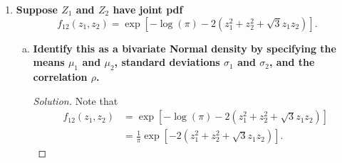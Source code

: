 \documentclass[11pt]{article}
\newenvironment{solution}
  {\renewcommand\qedsymbol{$\blacksquare$}\begin{proof}[Solution]}
  {\end{proof}}
\begin{document}
\begin{enumerate}
\begin{enumerate}[a)]
\begin{solution}
      which intuitively is the pdf for a $\mathrm{Gamma}(2, \lambda)$ random variable. 
      \end{solution}

      \item \textbf{Show that taking partial derivatives of $F_{xy}$ with respect to $x$ and $y$ yields the joint pdf:}
      \[
        \frac{\partial^2}{\partial x \partial y}F_{xy}(x, y) = \lambda^2 e^{-\lambda y}I(0< x < y). 
      \]

      \begin{solution}
      Finally, we can derive the joint pdf. Note that
      \begin{align*}
        f_{xy}(x, y) = \frac{\partial^2}{\partial x \partial y}F_{xy}(x, y) &= \frac{\partial}{\partial x}\left( \frac{\partial}{\partial y} F_{xy}(x, y)\right) \\
        &= \frac{\partial}{\partial x}\left( \frac{\partial}{\partial y} F_{xy}(x, y)\right) \\
        &= \frac{\partial}{\partial x}\left( \frac{\partial}{\partial y}  \left( I(0 < x < y) \left(1 - e^{-\lambda x} - \lambda xe^{-\lambda y}\right) \right)\right) \\
        &= \frac{\partial}{\partial x}\left( I(0 < x < y) \lambda^2 xe^{-\lambda y} \right) \\
        &= \boxed{\lambda^2 e^{-\lambda y}I(0 < x < y)}
      \end{align*}

      as desired.
      \end{solution}
    \end{enumerate}

    \newpage

    \item \textbf{Suppose $Z_1$ and $Z_2$ have joint pdf}
    \[
      f_{12}(z_1, z_2) = \exp \left[ -\log (\pi ) - 2(z_1^2 + z_2^2 + \sqrt{3}z_1 z_2) \right].
    \]
    \begin{enumerate}[a)]
      \item \textbf{Identify this as a bivariate Normal density by specifying the means $\mu_1$ and $\mu_2$, standard deviations $\sigma_1$ and $\sigma_2$, and the correlation $ \rho $.}
      
      \begin{solution}
        Note that 
        \begin{align*}
          f_{12}(z_1, z_2) &= \exp \left[ -\log (\pi ) - 2(z_1^2 + z_2^2 + \sqrt{3}z_1 z_2) \right] \\
          &= \frac{1}{\pi} \exp \left[ - 2(z_1^2 + z_2^2 + \sqrt{3}z_1 z_2) \right].
        \end{align*}


\end{solution}
\end{enumerate}
\end{enumerate}
\end{document}
